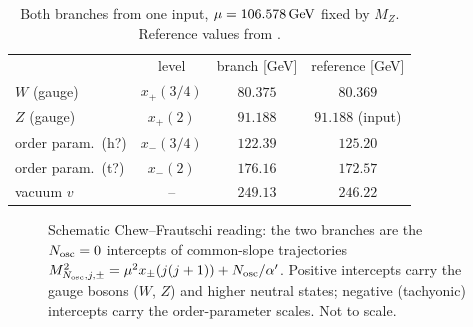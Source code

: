 \documentclass[aps,prl,reprint,superscriptaddress,nofootinbib]{revtex4-2}
\begin{document}
\begin{table}[t]
\caption{Both branches from one input, $\mu=106.578\,\mathrm{GeV}$ fixed by $M_Z$.
Reference values from \cite{PDG2025}.}
\label{tab:spectrum}
\begin{ruledtabular}
\begin{tabular}{lccc}
 & level & branch [GeV] & reference [GeV] \\
\colrule
$W$ (gauge)        & $x_+(3/4)$ & $80.375$  & $80.369$ \\
$Z$ (gauge)        & $x_+(2)$   & $91.188$  & $91.188$ (input) \\
order param.\ (h?) & $x_-(3/4)$ & $122.39$  & $125.20$ \\
order param.\ (t?) & $x_-(2)$   & $176.16$  & $172.57$ \\
vacuum $v$         & --         & $249.13$  & $246.22$ \\
\end{tabular}
\end{ruledtabular}
\end{table}

\begin{figure}[t]
\centering
{}
\caption{Schematic Chew--Frautschi reading: the two branches are the
$N_{\rm osc}=0$ intercepts of common-slope trajectories
$M^2_{N_{\rm osc},j,\pm}=\mu^2x_\pm(j(j+1))+N_{\rm osc}/\alpha'$. Positive
intercepts carry the gauge bosons ($W$, $Z$) and higher neutral states; negative
(tachyonic) intercepts carry the order-parameter scales. Not to scale.}
\label{fig:regge}
\end{figure}
\end{document}
